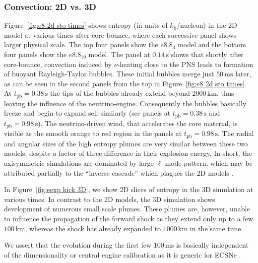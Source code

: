 \documentclass[fleqn,usenatbib]{mnras}
\newcommand{\tpb}{\ensuremath{t_{\text{pb}}}}
\newcommand{\km}{\ensuremath{\mathrm{km}}\xspace}
\renewcommand{\sec}{\xspace\ensuremath{\text{s}}}
\newcommand{\ms}{\xspace\ensuremath{\text{ms}}}
\newcommand{\kbpnuc}{k_{\text{b}}/\text{nucleon}}
\begin{document}
\subsubsection{Convection: 2D vs. 3D}
Figure~\ref{fig:e8 2d sto times} shows entropy (in units of $\kbpnuc$) in the 2D model at various times after core-bounce, where each successive panel shows larger physical scale. The top four panels show the $e8.8_{3}$ model and the bottom four panels show the $e8.8_{10}$ model.
The panel at $0.14\, \sec$ shows that shortly after core-bounce, convection induced  by $\nu$-heating close to the PNS leads to formation of buoyant Rayleigh-Taylor bubbles. These initial bubbles merge just $50\,\ms$ later, as can be seen in the second panels from the top in Figure~\ref{fig:e8 2d sto times}. At $\tpb=0.38\,\sec$ the tips of the bubbles already extend beyond $2000\,\km$, thus leaving the influence of the neutrino-engine. Consequently the bubbles basically freeze and begin to expand self-similarly (see panels at $\tpb=0.38\,\sec$ and $\tpb=0.98\,\sec$). The neutrino-driven wind, that accelerates the core material, is visible as the smooth orange to red region in the panels at $\tpb=0.98\,\sec$.
The radial and angular sizes of the high entropy plumes are very similar between these two models, despite a factor of three difference in their explosion energy. In short, the axisymmetric simulations are dominated by large $\ell$-mode pattern, which may be attributed partially to the ``inverse cascade'' which plagues the 2D models \cite{Kraichnan1967,Mueller2015}.

In Figure~\ref{fig:eexp kick 3D}, we show 2D slices of entropy in the 3D simulation at various times. In contrast to the 2D models, the 3D simulation shows development of numerous small scale plumes. These plumes are, however, unable to influence the propagation of the forward shock as they extend only up to a few $100 \,\mathrm{km}$, whereas the shock has already expanded to $1000\,\mathrm{km}$ in the same time. 

We assert that the evolution during the first few $100\,\text{ms}$ is basically independent of the dimensionality or central engine calibration as it is generic for ECSNe \cite{Gessner2018}.
\end{document}
